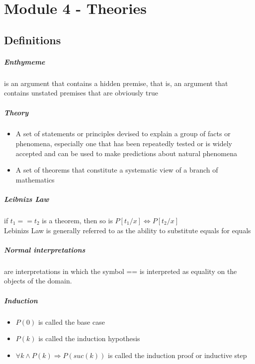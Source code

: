 \documentclass[12pt]{report}
\begin{document}
\chapter{Module 4 - Theories}
  \section{Definitions}
    \paragraph{Enthymeme} is an argument that contains a hidden premise, that
    is, an argument that contains unstated premises that are obviously true

    \paragraph{Theory}
    \begin{itemize}
      \item A set of statements or principles devised to explain a group of
      facts or phenomena, especially one that has been repeatedly tested or is
      widely accepted and can be used to make predictions about natural
      phenomena
      \item A set of theorems that constitute a systematic view of a branch of
      mathematics
    \end{itemize}

    \paragraph{Leibnizs Law} if $t_1 == t_2$ is a theorem, then so is $P[ t_1 / x ]
    \Leftrightarrow P[ t_2 / x ]$\\
    Lebinizs Law is generally referred to as the ability to substitute equals
    for equals

    \paragraph{Normal interpretations} are interpretations in which the symbol
    == is interpreted as equality on the objects of the domain.

    \paragraph{Induction}
      \begin{itemize}
        \item $P(0)$ is called the base case
        \item $P(k)$ is called the induction hypothesis
        \item $\forall k \wedge P(k) \Rightarrow P(suc(k))$ is called the
        induction proof or inductive step
      \end{itemize}
\end{document}
